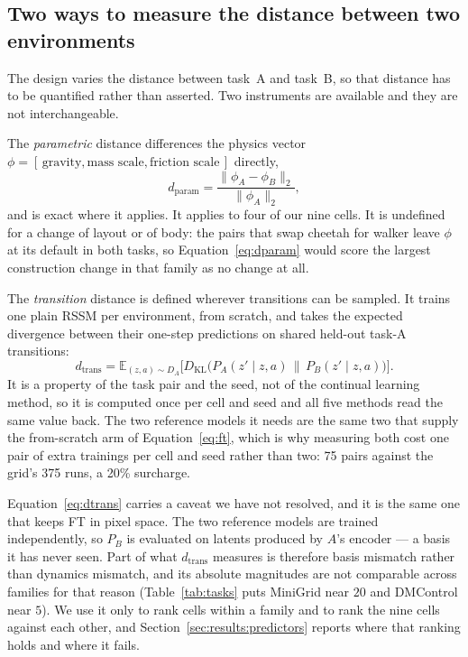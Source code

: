 \subsection{Two ways to measure the distance between two environments}
\label{sec:method:distances}

The design varies the distance between task~A and task~B, so that distance has
to be quantified rather than asserted. Two instruments are available and they
are not interchangeable.

The \emph{parametric} distance differences the physics vector
$\phi = [\,\text{gravity}, \text{mass scale}, \text{friction scale}\,]$ directly,
%
\begin{equation}
  d_{\mathrm{param}} = \frac{\lVert \phi_A - \phi_B \rVert_2}
  {\lVert \phi_A \rVert_2},
  \label{eq:dparam}
\end{equation}
%
and is exact where it applies. It applies to four of our nine cells. It is
undefined for a change of layout or of body: the pairs that swap cheetah for
walker leave $\phi$ at its default in both tasks, so
Equation~\ref{eq:dparam} would score the largest construction change in that
family as no change at all.

The \emph{transition} distance is defined wherever transitions can be sampled.
It trains one plain RSSM per environment, from scratch, and takes the expected
divergence between their one-step predictions on shared held-out task-A
transitions:
%
\begin{equation}
  d_{\mathrm{trans}} = \mathbb{E}_{(z,a) \sim D_A}
  \Big[ D_{\mathrm{KL}}\big(P_A(z' \mid z, a) \,\big\|\, P_B(z' \mid z, a)\big)
  \Big].
  \label{eq:dtrans}
\end{equation}
%
It is a property of the task pair and the seed, not of the continual learning
method, so it is computed once per cell and seed and all five methods read the
same value back. The two reference models it needs are the same two that supply
the from-scratch arm of Equation~\ref{eq:ft}, which is why measuring both cost
one pair of extra trainings per cell and seed rather than two: 75 pairs against
the grid's 375 runs, a 20\% surcharge.

Equation~\ref{eq:dtrans} carries a caveat we have not resolved, and it is the
same one that keeps FT in pixel space. The two reference models are trained
independently, so $P_B$ is evaluated on latents produced by $A$'s encoder --- a
basis it has never seen. Part of what
$d_{\mathrm{trans}}$ measures is therefore basis mismatch rather than
dynamics mismatch, and its absolute magnitudes are not comparable across
families for that reason (Table~\ref{tab:tasks} puts MiniGrid near $20$ and
DMControl near $5$). We use it only to rank cells within a family and to rank
the nine cells against each other, and Section~\ref{sec:results:predictors}
reports where that ranking holds and where it fails.

